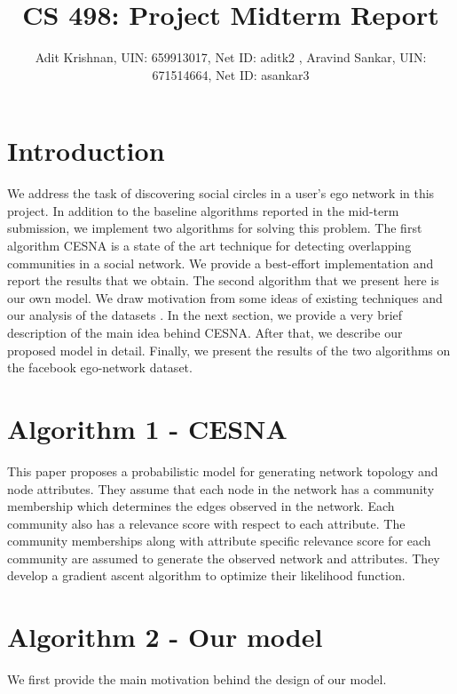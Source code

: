 \documentclass[11pt]{article}
\begin{document}
 
 
 
\title{CS 498: Project Midterm Report}%
\author{Adit Krishnan, UIN: 659913017, Net ID: aditk2 , Aravind Sankar, UIN: 671514664, Net ID: asankar3 \\} %
\maketitle


\section{Introduction}
We address the task of discovering social circles in a user's ego network in this project. In addition to the baseline algorithms reported in the mid-term submission, we implement two algorithms for solving this problem. The first algorithm CESNA \cite{cesna} is a state of the art technique for detecting overlapping communities in a social network. We provide a best-effort implementation and report the results that we obtain. The second algorithm that we present here is our own model. We draw motivation from some ideas of existing techniques and our analysis of the datasets \cite{SNAP dataset}. 
In the next section, we provide a very brief description of the main idea behind CESNA. 
After that, we describe our proposed model in detail. Finally, we present the results of the two algorithms on the facebook ego-network dataset.

\section{Algorithm 1 - CESNA}
This paper proposes a probabilistic model for generating network topology and node attributes. They assume that each node in the network has a community membership which determines the edges observed in the network. Each community also has a relevance score with respect to each attribute. The community memberships along with attribute specific relevance score for each community are assumed to generate the observed network and attributes. They develop a gradient ascent algorithm to optimize their likelihood function.
\section{Algorithm 2 - Our model}
We first provide the main motivation behind the design of our model.
\end{document}
